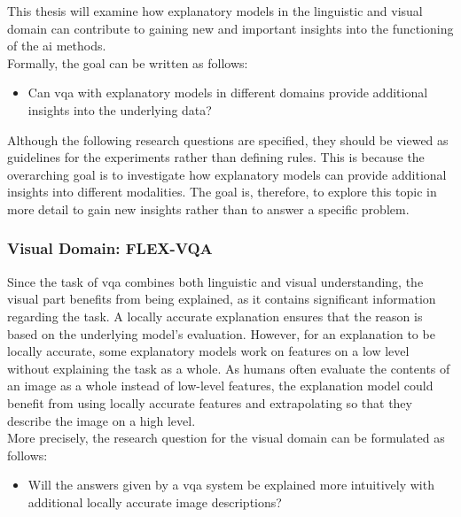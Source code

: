     

This thesis will examine how explanatory models in the linguistic and visual domain can contribute to gaining new and important insights into the functioning of the \gls{ai} methods.\\
Formally, the goal can be written as follows:
\begin{itemize}
    \item Can \gls{vqa} with explanatory models in different domains provide additional insights into the underlying data?
\end{itemize}

Although the following research questions are specified, they should be viewed as guidelines for the experiments rather than defining rules. 
This is because the overarching goal is to investigate how explanatory models can provide additional insights into different modalities. The goal is, therefore, to explore this topic in more detail to gain new insights rather than to answer a specific problem.


\subsubsection{Visual Domain: FLEX-VQA}
Since the task of \gls{vqa} combines both linguistic and visual understanding, the visual part benefits from being explained, as it contains significant information regarding the task. 
A locally accurate explanation ensures that the reason is based on the underlying model's evaluation.
However, for an explanation to be locally accurate, some explanatory models work on features on a low level without explaining the task as a whole. 
As humans often evaluate the contents of an image as a whole instead of low-level features, the explanation model could benefit from using locally accurate features and extrapolating so that they describe the image on a high level.\\
More precisely, the research question for the visual domain can be formulated as follows:

\begin{itemize}
    \item Will the answers given by a \gls{vqa} system be explained more intuitively with additional locally accurate image descriptions?
\end{itemize}

